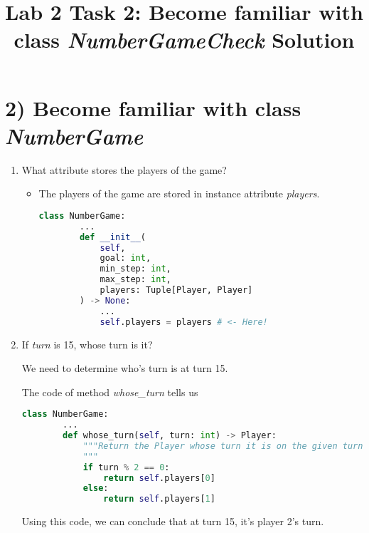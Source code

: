 \documentclass[12pt]{article}
\begin{document}
\title{Lab 2 Task 2: Become familiar with class \textit{NumberGameCheck} Solution}
\date{}
\maketitle

\section*{2) Become familiar with class \textit{NumberGame}}
\begin{enumerate}[1.]
    \item What attribute stores the players of the game?

    \begin{itemize}
    \item The players of the game are stored in instance attribute \textit{players}.

    \begin{lstlisting}[language=Python]
    class NumberGame:
        ...
        def __init__(
            self,
            goal: int,
            min_step: int,
            max_step: int,
            players: Tuple[Player, Player]
        ) -> None:
            ...
            self.players = players # <- Here!
    \end{lstlisting}
    \end{itemize}

    \item If \textit{turn} is 15, whose turn is it?

    \bigskip

    We need to determine who's turn is at turn 15.

    \bigskip

    The code of method \textit{whose\_turn} tells us

    \bigskip

    \begin{lstlisting}[language=Python]
    class NumberGame:
        ...
        def whose_turn(self, turn: int) -> Player:
            """Return the Player whose turn it is on the given turn number.
            """
            if turn % 2 == 0:
                return self.players[0]
            else:
                return self.players[1]
    \end{lstlisting}

    \bigskip

    Using this code, we can conclude that at turn 15, it's player 2's turn.


\end{enumerate}
\end{document}
